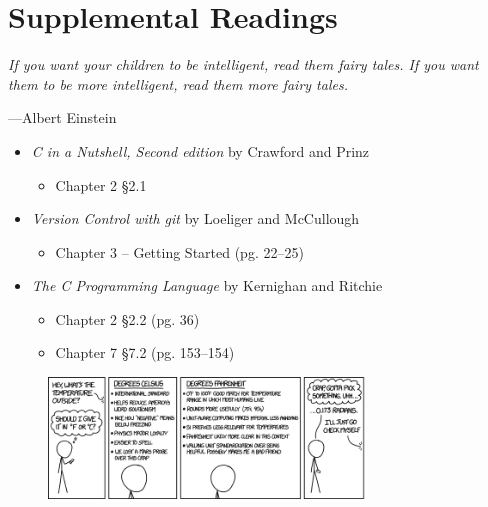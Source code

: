 \documentclass{article}
\begin{document}
\section{Supplemental Readings}
\epigraph{\emph{If you want your children to be intelligent, read them fairy
tales. If you want them to be more intelligent, read them more fairy
tales.}}{---Albert Einstein}

\begin{itemize}
	\item \textit{C in a Nutshell, Second edition} by Crawford and Prinz
	\begin{itemize}
		\item Chapter 2 \S 2.1
	\end{itemize}

	\item \textit{Version Control with git} by Loeliger and McCullough
	\begin{itemize}
		\item Chapter 3 -- Getting Started (pg. 22--25)
	\end{itemize}

	\item \textit{The C Programming Language} by Kernighan and Ritchie

	\begin{itemize}
		\item Chapter 2 \S 2.2 (pg. 36)
		\item Chapter 7 \S 7.2 (pg. 153--154)
	\end{itemize}
\end{itemize}

\begin{figure}[tb]
\begin{center}
\includegraphics[width=0.75\textwidth]{degrees}
\end{center}
\end{figure}
\end{document}

